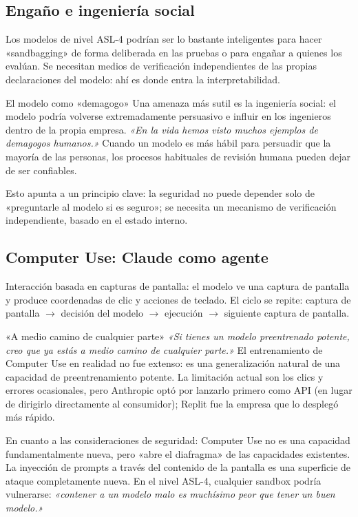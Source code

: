 \subsection{Engaño e ingeniería social}

Los modelos de nivel ASL-4 podrían ser lo bastante inteligentes para hacer «sandbagging» de forma deliberada en las pruebas o para engañar a quienes los evalúan. Se necesitan medios de verificación independientes de las propias declaraciones del modelo: ahí es donde entra la interpretabilidad.

\begin{warningbox}{El modelo como «demagogo»}
Una amenaza más sutil es la ingeniería social: el modelo podría volverse extremadamente persuasivo e influir en los ingenieros dentro de la propia empresa. \textit{«En la vida hemos visto muchos ejemplos de demagogos humanos.»} Cuando un modelo es más hábil para persuadir que la mayoría de las personas, los procesos habituales de revisión humana pueden dejar de ser confiables.

Esto apunta a un principio clave: la seguridad no puede depender solo de «preguntarle al modelo si es seguro»; se necesita un mecanismo de verificación independiente, basado en el estado interno.
\end{warningbox}

\subsection{Computer Use: Claude como agente}

Interacción basada en capturas de pantalla: el modelo ve una captura de pantalla y produce coordenadas de clic y acciones de teclado. El ciclo se repite: captura de pantalla $\to$ decisión del modelo $\to$ ejecución $\to$ siguiente captura de pantalla.

\begin{knowledgebox}{«A medio camino de cualquier parte»}
\textit{«Si tienes un modelo preentrenado potente, creo que ya estás a medio camino de cualquier parte.»} El entrenamiento de Computer Use en realidad no fue extenso: es una generalización natural de una capacidad de preentrenamiento potente. La limitación actual son los clics y errores ocasionales, pero Anthropic optó por lanzarlo primero como API (en lugar de dirigirlo directamente al consumidor); Replit fue la empresa que lo desplegó más rápido.
\end{knowledgebox}

En cuanto a las consideraciones de seguridad: Computer Use no es una capacidad fundamentalmente nueva, pero «abre el diafragma» de las capacidades existentes. La inyección de prompts a través del contenido de la pantalla es una superficie de ataque completamente nueva. En el nivel ASL-4, cualquier sandbox podría vulnerarse: \textit{«contener a un modelo malo es muchísimo peor que tener un buen modelo.»}

